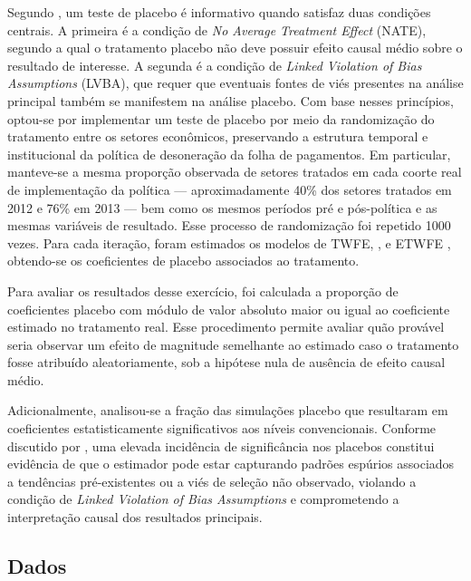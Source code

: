 \documentclass[12pt,a4paper,oneside]{article}
\begin{document}
Segundo \citet{Eggers2024}, um teste de placebo é informativo quando satisfaz duas condições centrais. A primeira é a condição de \emph{No Average Treatment Effect} (NATE), segundo a qual o tratamento placebo não deve possuir efeito causal médio sobre o resultado de interesse. A segunda é a condição de \emph{Linked Violation of Bias Assumptions} (LVBA), que requer que eventuais fontes de viés presentes na análise principal também se manifestem na análise placebo. Com base nesses princípios, optou-se por implementar um teste de placebo por meio da randomização do tratamento entre os setores econômicos, preservando a estrutura temporal e institucional da política de desoneração da folha de pagamentos. Em particular, manteve-se a mesma proporção observada de setores tratados em cada coorte real de implementação da política — aproximadamente 40\% dos setores tratados em 2012 e 76\% em 2013 — bem como os mesmos períodos pré e pós-política e as mesmas variáveis de resultado. Esse processo de randomização foi repetido 1000 vezes. Para cada iteração, foram estimados os modelos de TWFE, \citet{Callaway2021}, \citet{Sun2021} e ETWFE \citep{Wooldridge2025}, obtendo-se os coeficientes de placebo associados ao tratamento.

Para avaliar os resultados desse exercício, foi calculada a proporção de coeficientes placebo com módulo de valor absoluto maior ou igual ao coeficiente estimado no tratamento real. Esse procedimento permite avaliar quão provável seria observar um efeito de magnitude semelhante ao estimado caso o tratamento fosse atribuído aleatoriamente, sob a hipótese nula de ausência de efeito causal médio.

Adicionalmente, analisou-se a fração das simulações placebo que resultaram em coeficientes estatisticamente significativos aos níveis convencionais. Conforme discutido por \citet{Eggers2024}, uma elevada incidência de significância nos placebos constitui evidência de que o estimador pode estar capturando padrões espúrios associados a tendências pré-existentes ou a viés de seleção não observado, violando a condição de \emph{Linked Violation of Bias Assumptions} e comprometendo a interpretação causal dos resultados principais.


		
		
\subsection{Dados}
\end{document}

